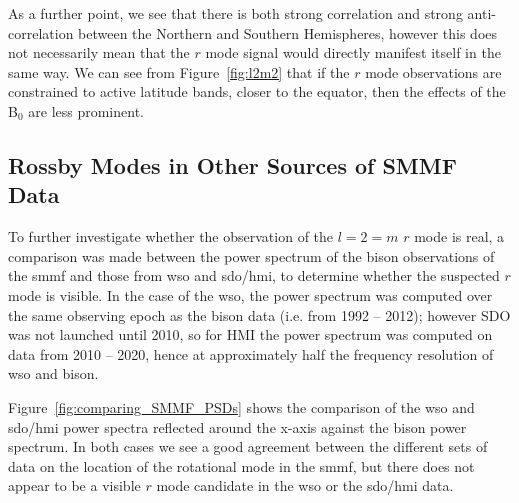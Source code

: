 As a further point, we see that there is both strong correlation and strong anti-correlation between the Northern and Southern Hemispheres, however this does not necessarily mean that the $r$ mode signal would directly manifest itself in the same way. We can see from Figure~\ref{fig:l2m2} that if the $r$ mode observations are constrained to active latitude bands, closer to the equator, then the effects of the B$_0$ are less prominent.

\subsection{Rossby Modes in Other Sources of SMMF Data}

To further investigate whether the observation of the  $l=2=m$ $r$ mode is real, a comparison was made between the power spectrum of the \gls{bison} observations of the \gls{smmf} and those from \gls{wso} and \gls{sdo/hmi}, to determine whether the suspected $r$ mode is visible. In the case of the \gls{wso}, the power spectrum was computed over the same observing epoch as the \gls{bison} data (i.e. from 1992 -- 2012); however SDO was not launched until 2010, so for HMI the power spectrum was computed on data from 2010 -- 2020, hence at approximately half the frequency resolution of \gls{wso} and \gls{bison}.

Figure~\ref{fig:comparing_SMMF_PSDs} shows the comparison of the \gls{wso} and \gls{sdo/hmi} power spectra reflected around the x-axis against the \gls{bison} power spectrum. In both cases we see a good agreement between the different sets of data on the location of the rotational mode in the \gls{smmf}, but there does not appear to be a visible $r$ mode candidate in the \gls{wso} or the \gls{sdo/hmi} data.

